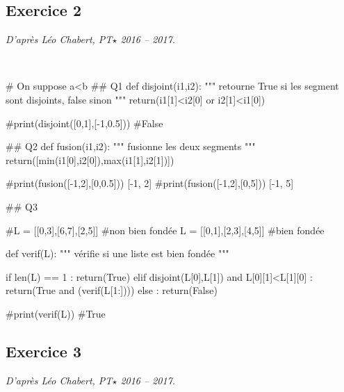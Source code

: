 \documentclass[10pt,fleqn]{article} %
\begin{document}
\subsection*{Exercice 2}
\textit{D'après Léo Chabert, PT$\star$ 2016 -- 2017.}

\begin{corrige}
$\quad$
\begin{python}
# On suppose a<b
## Q1
def disjoint(i1,i2):
    """ retourne True si les segment sont disjoints, false sinon """
    return(i1[1]<i2[0] or i2[1]<i1[0])

#print(disjoint([0,1],[-1,0.5]))
#False

## Q2
def fusion(i1,i2):
    """ fusionne les deux segments """
    return([min(i1[0],i2[0]),max(i1[1],i2[1])])

#print(fusion([-1,2],[0,0.5])) [-1, 2]
#print(fusion([-1,2],[0,5])) [-1, 5]


## Q3

#L = [[0,3],[6,7],[2,5]]
#non bien fondée
L = [[0,1],[2,3],[4,5]]
#bien fondée

def verif(L):
    """ vérifie si une liste est bien fondée """

    if len(L) == 1 :
        return(True)
    elif disjoint(L[0],L[1]) and L[0][1]<L[1][0] :
        return(True and (verif(L[1:])))
    else :
        return(False)
    
#print(verif(L))
#True
\end{python}
\end{corrige}

\subsection*{Exercice 3}
\textit{D'après Léo Chabert, PT$\star$ 2016 -- 2017.}
\end{document}
